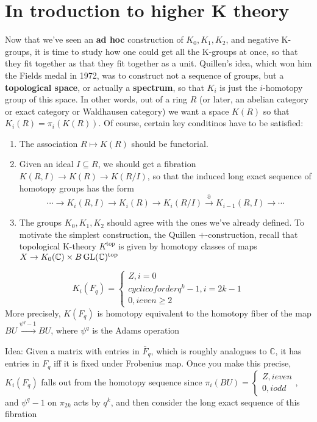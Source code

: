 \documentclass[main]{subfiles}
\begin{document}
\section{In troduction to higher K theory}

Now that we've seen an \textbf{ad hoc} construction of $K_0,K_1,K_2$, and negative K-groups, it is time to study how one could get all the K-groups at once, so that they fit together as that they fit together as a unit. Quillen's idea, which won him the Fields medal in 1972, was to construct not a sequence of groups, but a \textbf{topological space}, or actually a \textbf{spectrum}, so that $K_i$ is just the $i$-homotopy group of this space. In other words, out of a ring $R$ (or later, an abelian category or exact category or Waldhausen category) we want a space $K(R)$ so that $K_i(R)=\pi_i(K(R))$. Of course, certain key conditinos have to be satisfied:
\begin{enumerate}[label=\alph*)]
\item The association $R\mapsto K(R)$ should be functorial.
\item Given an ideal $I\subseteq R$, we should get a fibration $K(R,I)\to K(R)\to K(R/I)$, so that the induced long exact sequence of homotopy groups has the form
\[
\cdots\to K_i(R,I)\to K_i(R)\to K_i(R/I)\xrightarrow{\partial}K_{i-1}(R,I)\to\cdots
\]
\item The groups $K_0,K_1,K_2$ should agree with the ones we've already defined. To motivate the simplest construction, the Quillen $+$-construction, recall that topological K-theory $K^{\text{top}}$ is given by homotopy classes of maps $X\to K_0(\mathbb C)\times B\operatorname{GL}(\mathbb C)^{\text{top}}$
\end{enumerate}

\begin{theorem}
\[K_i(F_q)=
\begin{cases}
Z,i=0\\
cyclic of order q^k-1, i=2k-1\\
0, i even \geq2
\end{cases}
\]
More precisely, $K(F_q)$ is homotopy equivalent to the homotopy fiber of the map $BU\xrightarrow{\psi^q-1}BU$, where $\psi^q$ is the Adams operation
\end{theorem}

Idea: Given a matrix with entries in $\bar F_q$, which is roughly analogues to $\mathbb C$, it has entries in $F_q$ iff it is fixed under Frobenius map. Once you make this precise, $K_i(F_q)$ falls out from the homotopy sequence since $\pi_i(BU)=\begin{cases}
Z, i even\\
0, i odd
\end{cases}$, and $\psi^q-1$ on $\pi_{2k}$ acts by $q^k$, and then consider the long exact sequence of this fibration
\end{document}
